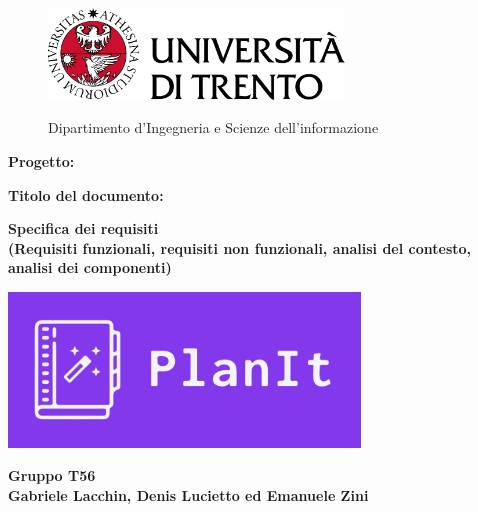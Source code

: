 \begin{titlepage}
    \begin{figure}[!htb]
        \includegraphics[width=0.7\textwidth]{img/logo_unitn.png}
        \endminipage
        \hfill
        \begin{flushright}
            \Large
            Dipartimento d'Ingegneria e Scienze dell'informazione
        \end{flushright}
        \endminipage
        \hfill
    \end{figure}

    \vspace{3cm}

    \large
    \textbf{Progetto:}
    \begin{center}
        \Huge
        \color{blue}
        \textbf{\nome}
    \end{center}

    \vspace{1cm}

    \textbf{Titolo del documento:}
    \begin{center}
        \huge
        \color{blue}
        \textbf{Specifica dei requisiti}\\
        \textbf{(Requisiti funzionali, requisiti non funzionali, analisi del contesto, analisi dei componenti)}
    \end{center}

    \vspace{2cm}

    \begin{center}
        \includegraphics[width=0.7\textwidth, height=0.2\textheight]{img/LogoNuovo.png}
    \end{center}
    \vspace{2cm}

    \begin{center}
        \large
        \textbf{Gruppo T56}\\
        \textbf{Gabriele Lacchin, Denis Lucietto ed Emanuele Zini}
    \end{center}

\end{titlepage}